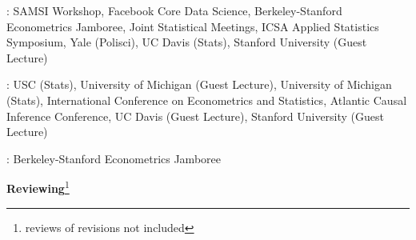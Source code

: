 \documentclass{article}
\begin{document}
\vspace{4mm}
: SAMSI Workshop, Facebook Core Data Science, Berkeley-Stanford Econometrics Jamboree, Joint Statistical Meetings, ICSA Applied Statistics Symposium, Yale (Polisci), UC Davis (Stats), Stanford University (Guest Lecture)

\vspace{4mm}
: USC (Stats), University of Michigan (Guest Lecture), University of Michigan (Stats), International Conference on Econometrics and Statistics, Atlantic Causal Inference Conference, UC Davis (Guest Lecture), Stanford University (Guest Lecture)

\vspace{4mm}
: Berkeley-Stanford Econometrics Jamboree
 











\vspace{7mm}
\begin{large}
\noindent \textbf{Reviewing}\footnote{reviews of revisions not included}
\end{large}
\end{document}
